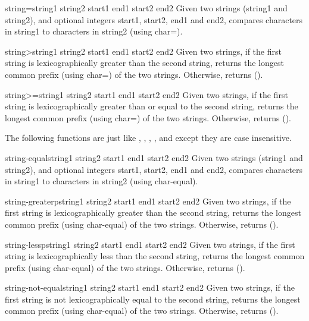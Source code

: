 \documentclass[10pt,english]{book}
\begin{document}
\begin{function}{string=}{string1 string2 \key start1 end1 start2 end2}
  Given two strings (string1 and string2), and optional integers start1,
  start2, end1 and end2, compares characters in string1 to characters in
  string2 (using char=).
\end{function}

\begin{function}{string>}{string1 string2 \key start1 end1 start2 end2}
  Given two strings, if the first string is lexicographically greater than
  the second string, returns the longest common prefix (using char=)
  of the two strings. Otherwise, returns ().
\end{function}

\begin{function}{string>=}{string1 string2 \key start1 end1 start2 end2}
  Given two strings, if the first string is lexicographically greater
  than or equal to the second string, returns the longest common prefix
  (using char=) of the two strings. Otherwise, returns ().
\end{function}

The following functions are just like , , ,
, and  except they are case insensitive.

\begin{function}{string-equal}{string1 string2 \key start1 end1 start2 end2}
  Given two strings (string1 and string2), and optional integers start1,
  start2, end1 and end2, compares characters in string1 to characters in
  string2 (using char-equal).
\end{function}

\begin{function}{string-greaterp}{string1 string2 \key start1 end1 start2 end2}
  Given two strings, if the first string is lexicographically greater than
  the second string, returns the longest common prefix (using char-equal)
  of the two strings. Otherwise, returns ().
\end{function}

\begin{function}{string-lessp}{string1 string2 \key start1 end1 start2 end2}
  Given two strings, if the first string is lexicographically less than
  the second string, returns the longest common prefix (using char-equal)
  of the two strings. Otherwise, returns ().
\end{function}

\begin{function}{string-not-equal}{string1 string2 \key start1 end1 start2 end2}
  Given two strings, if the first string is not lexicographically equal
  to the second string, returns the longest common prefix (using char-equal)
  of the two strings. Otherwise, returns ().
\end{function}
\end{document}
